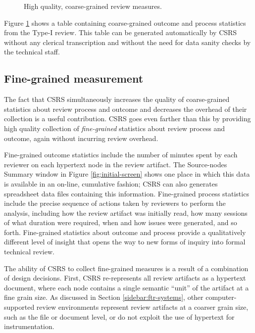 \begin{figure} 
 {\centerline{}}
\caption{High quality, coarse-grained review measures.}
\label{fig:coarse-grained}
\end{figure}

Figure \ref{fig:coarse-grained} shows a table containing coarse-grained
outcome and process statistics from the Type-I review.  This table can be
generated automatically by CSRS without any clerical transcription and
without the need for data sanity checks by the technical staff. 

\subsection{Fine-grained measurement}

The fact that CSRS simultaneously increases the quality of coarse-grained
statistics about review process and outcome and decreases the overhead of
their collection is a useful contribution.  CSRS goes even farther than
this by providing high quality collection of {\em fine-grained} statistics
about review process and outcome, again without incurring review overhead.

Fine-grained outcome statistics include the number of minutes spent by each
reviewer on each hypertext node in the review artifact.  The Source-nodes
Summary window in Figure \ref{fig:initial-screen} shows one place in which
this data is available in an on-line, cumulative fashion; CSRS can also
generates spreadsheet data files containing this information.  Fine-grained
process statistics include the precise sequence of actions taken by
reviewers to perform the analysis, including how the review artifact was
initially read, how many sessions of what duration were required, when and
how issues were generated, and so forth.  Fine-grained statistics about
outcome and process provide a qualitatively different level of insight that
opens the way to new forms of inquiry into formal technical review.

The ability of CSRS to collect fine-grained measures is a result of a
combination of design decisions.  First, CSRS re-represents all review
artifacts as a hypertext document, where each node contains a single
semantic ``unit'' of the artifact at a fine grain size. As
discussed in Section \ref{sidebar:ftr-systems},  other
computer-supported review environments represent review artifacts at a
coarser grain size, such as the file or document level, or do not exploit
the use of hypertext for instrumentation. 

